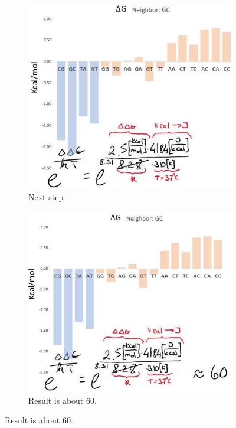 \documentclass[]{article}
\begin{document}
\begin{figure}[H]
\begin{subfigure}[t]{0.45\textwidth}
	\end{subfigure}
	\begin{subfigure}[t]{0.45\textwidth}
		\caption{Next step} \label{fig:BindingDifference2} 
		\includegraphics[width=\textwidth]{BindingDifference2}
	\end{subfigure}
	\begin{subfigure}[t]{0.45\textwidth}
		\caption{Result is about 60.} \label{fig:BindingDifference3} 
		\includegraphics[width=\textwidth]{BindingDifference3}
	\end{subfigure}
\end{figure}
\end{document}
